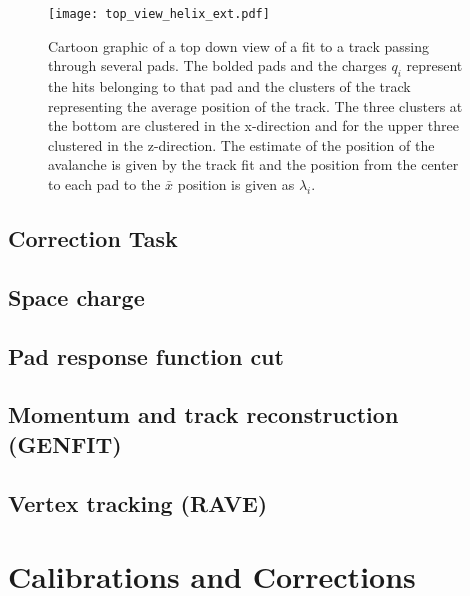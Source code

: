 \begin{figure}[H]
\texttt{[image: top\_view\_helix\_ext.pdf]}
\caption{Cartoon graphic of a top down view of a fit to a track passing through several pads. The bolded pads and the charges $q_i$ represent the hits belonging to that pad and the clusters of the track representing the average position of the track. The three clusters at the bottom are clustered in the x-direction and for the upper three clustered in the z-direction. The estimate of the position of the avalanche is given by the track fit and the position from the center to each pad to the $\bar{x}$ position is given as $\lambda_i$.}
\label{fig:topview}
\end{figure}

\subsection{Correction Task}

\subsection{Space charge}

\subsection{Pad response function cut}


\subsection{Momentum and track reconstruction (GENFIT)}


\subsection{Vertex tracking (RAVE)}
\label{sec:vertex
}



\section{Calibrations and Corrections}


